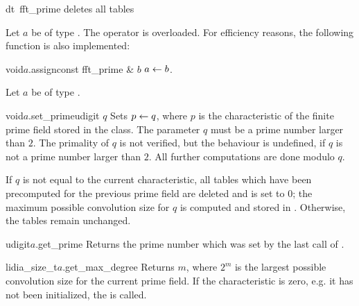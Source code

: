 \begin{fcode}{dt}{~fft_prime}{}
  deletes all tables
\end{fcode}



\ASGN

Let $a$ be of type .  The operator \code{=} is overloaded.  For efficiency
reasons, the following function is also implemented:

\begin{fcode}{void}{$a$.assign}{const fft_prime & $b$}
  $a \leftarrow b$.
\end{fcode}



\BASIC

Let $a$ be of type .

\begin{fcode}{void}{$a$.set_prime}{udigit $q$}
  Sets $p \leftarrow q$, where $p$ is the characteristic of the finite prime field stored in the
  class.  The parameter $q$ must be a prime number larger than $2$.  The primality of $q$ is not
  verified, but the behaviour is undefined, if $q$ is not a prime number larger than $2$.  All
  further computations are done modulo $q$.

  \begin{techdoc}
    If $q$ is not equal to the current characteristic, all tables which have been precomputed
    for the previous prime field are deleted and  is set to $0$; the
    maximum possible convolution size for $q$ is computed and stored in .
    Otherwise, the tables remain unchanged.
  \end{techdoc}
\end{fcode}

\begin{cfcode}{udigit}{$a$.get_prime}{}
  Returns the prime number which was set by the last call of .
\end{cfcode}

\begin{cfcode}{lidia_size_t}{$a$.get_max_degree}{}
  Returns $m$, where $2^m$ is the largest possible convolution size for the current prime field.
  If the characteristic is zero, e.g. it has not been initialized, the \LEH is called.
\end{cfcode}




